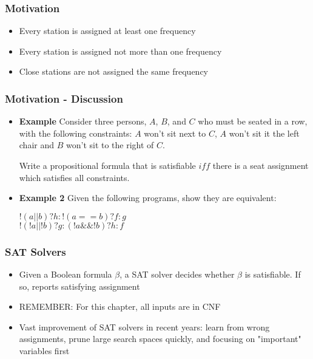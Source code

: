 \documentclass{beamer}
\begin{document}
\begin{frame}

 \frametitle{Motivation}
 
 \begin{itemize}
 
 \item Every station is assigned at least one frequency  
 \item Every station is assigned not more than one frequency 
 \item Close stations are not assigned the same frequency  

 
 \end{itemize}
 
\end{frame}

\begin{frame}

  \frametitle{Motivation - Discussion }

  \begin{itemize}
    \item \textbf{Example} Consider three persons, $A$, $B$, and $C$ who
      must be seated in a row, with the following constraints: 
      $A$ won't sit next to $C$, $A$ won't sit it the left chair
      and $B$ won't sit to the right of $C$.

      Write a propositional formula that is satisfiable $iff$ there
      is a seat assignment which satisfies all constraints.


    \item \textbf{Example 2} Given the following programs, show
      they are equivalent: 

     $!(a || b) ? h :!(a==b) ? f : g$\\
     $!(!a || !b) ? g : (!a \&\& !b) ? h : f$\\

  \end{itemize}


\end{frame}


\begin{frame}

 \frametitle{SAT Solvers}
 
 \begin{itemize}
 
 \item Given a Boolean formula \ensuremath{\beta}, a SAT solver decides whether \ensuremath{\beta} is satisfiable.  If so, reports satisfying assignment
 
 \item REMEMBER:  For this chapter, all inputs are in CNF
 \item Vast improvement of SAT solvers in recent years:  learn from wrong assignments, prune large search spaces quickly, and focusing on "important" variables first
 \end{itemize}
 
\end{frame}
\end{document}
